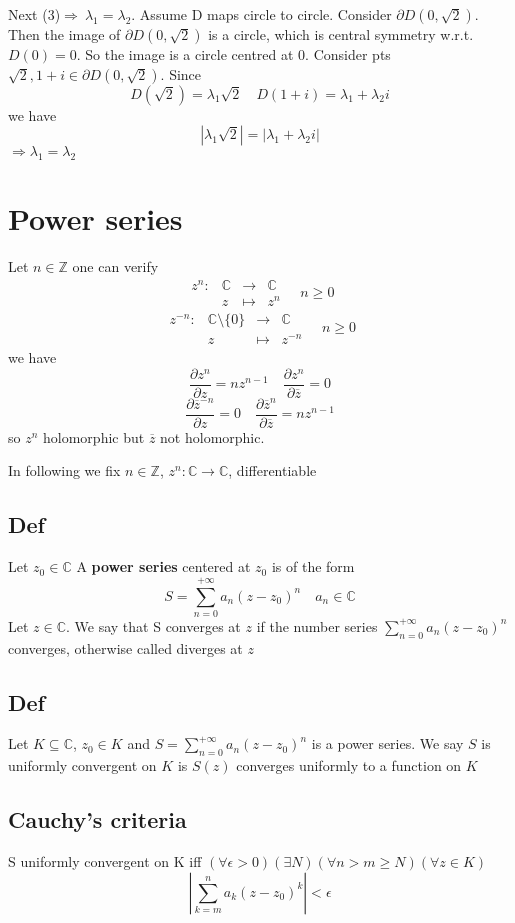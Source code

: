 \documentclass{book}
\newcommand{\abs}[1]{\left\lvert #1 \right\rvert}
\begin{document}
Next (3)$\Rightarrow\ \lambda_1=\lambda_2$. Assume D maps circle to circle. Consider $\partial D(0,\sqrt 2)$. Then the image of $\partial D(0,\sqrt 2)$ is a circle, which is central symmetry w.r.t. $D(0)=0$. So the image is a circle centred at 0. Consider pts $\sqrt 2,1+i\in \partial D(0,\sqrt 2)$. Since $$D(\sqrt 2)=\lambda_1\sqrt 2\quad D(1+i)=\lambda_1+\lambda_2i$$ we have $$\abs{\lambda_1\sqrt 2}=\abs{\lambda_1+\lambda_2i}$$
$\Rightarrow \lambda_1=\lambda_2$
\chapter{Power series}
Let $n\in \mathbb Z$ one can verify
$$\begin{aligned}
    z^n:&\mathbb C&\rightarrow&\mathbb C\\ &z&\mapsto&z^n
\end{aligned}\quad n\geq0$$
$$\begin{aligned}
    z^{-n}:&\mathbb C\setminus\{0\}&\rightarrow&\mathbb C\\ &z&\mapsto&z^{-n}
\end{aligned}\quad n\geq0$$
we have
$$\frac{\partial z^n}{\partial z}=nz^{n-1}\quad\frac{\partial z^n}{\partial\overline z}=0$$
$$\frac{\partial \overline z^{-n}}{\partial z}=0\quad\frac{\partial \overline z^n}{\partial\overline z}=nz^{n-1}$$
so $z^n$ holomorphic but $\overline z$ not holomorphic.

In following we fix $n\in \mathbb Z$, $z^n:\mathbb C\rightarrow \mathbb C$, differentiable
\section{Def}
Let $z_0\in \mathbb C$ A \textbf{power series} centered at $z_0$ is of the form $$S=\sum\limits_{n=0}^{+\infty}a_n(z-z_0)^n\quad a_n\in \mathbb C$$
Let $z\in \mathbb C$. We say that S converges at $z$ if the number series $\sum\limits_{n=0}^{+\infty}a_n(z-z_0)^n$ converges, otherwise called diverges at $z$
\section{Def}
Let $K\subseteq \mathbb C$, $z_0\in K$ and $S=\sum\limits_{n=0}^{+\infty}a_n(z-z_0)^n$ is a power series. We say $S$ is uniformly convergent on $K$ is $S(z)$ converges uniformly to a function on $K$
\section{Cauchy's criteria}
S uniformly convergent on K iff $(\forall \epsilon>0)(\exists N)(\forall n>m\geq N)(\forall z\in K)$
$$\abs{\sum\limits_{k=m}^na_k(z-z_0)^k}<\epsilon$$
\end{document}
